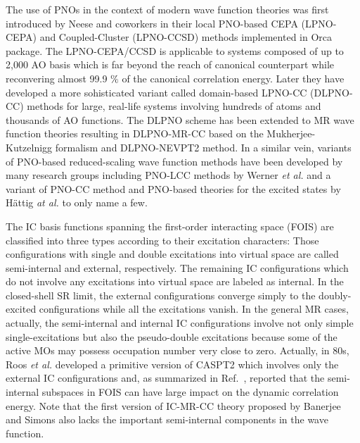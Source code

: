 \documentclass[aip,jcp,amsmath,twocolumn,floatfix,reprint,fleqn]{revtex4-1}
\begin{document}
%
The use of PNOs in the context of modern wave function theories was first introduced by Neese and coworkers in their local PNO-based CEPA (LPNO-CEPA)\cite{neeseefficient2009cepa} and Coupled-Cluster (LPNO-CCSD)\cite{neeseefficient2009,hansenefficient2011,doi:10.1021/ct100445s} methods implemented in Orca package.\cite{WCMS:WCMS1327}
%
The LPNO-CEPA/CCSD is applicable to systems composed of up to 2,000 AO basis which is far beyond the reach of canonical counterpart while reconvering almost 99.9 $\%$ of the canonical correlation energy.
%
Later they have developed a more sohisticated variant called domain-based LPNO-CC (DLPNO-CC) methods for large, real-life systems involving hundreds of atoms and thousands of AO functions.\cite{riplingeran2013,riplingernatural2013,pinskisparse2015,riplingersparse2016,doi:10.1063/1.4981521,dipayan2016}
%
The DLPNO scheme has been extended to MR wave function theories resulting in DLPNO-MR-CC based on the Mukherjee-Kutzelnigg formalism\cite{doi:10.1021/acs.jctc.5b00334,doi:10.1021/acs.jctc.7b01184,C8CP03577F} and DLPNO-NEVPT2\cite{:/content/aip/journal/jcp/144/9/10.1063/1.4942769} method.
%
In a similar vein, variants of PNO-based reduced-scaling wave function methods have been developed by many research groups including PNO-LCC methods by Werner {\it et al.}\cite{doi:10.1021/ct500725e,wernersdecay,doi:10.1021/acs.jctc.7b00554,publ7820099,publ8744633,publ9370681,publ9337428} and a variant of PNO-CC method and PNO-based theories for the excited states by H\"attig {\it at al.}\cite{doi:10.1080/00268976.2013.794314,doi:10.1080/00268976.2016.1263762,doi:10.1063/1.4972001,QUA:QUA24098,C4CP03502J,:/content/aip/journal/jcp/135/7/10.1063/1.3624370,:/content/aip/journal/jcp/135/21/10.1063/1.3664902,:/content/aip/journal/jcp/136/20/10.1063/1.4719981,:/content/aip/journal/jcp/139/8/10.1063/1.4819071} to only name a few.

%
The IC basis functions spanning the first-order interacting space (FOIS) are classified into three types according to their excitation characters:
%
Those configurations with single and double excitations into virtual space are called semi-internal and external, respectively.
%
The remaining IC configurations which do not involve any excitations into virtual space are labeled as internal.
%
In the closed-shell SR limit, the external configurations converge simply to the doubly-excited configurations while all the excitations vanish.
%
In the general MR cases, actually, the semi-internal and internal IC configurations involve not only simple single-excitations but also the pseudo-double excitations because some of the active MOs may possess occupation number very close to zero.
%
Actually, in 80s, Roos {\it et al.} developed a primitive version of CASPT2 which involves only the external IC configurations\cite{ROOS1982197} and, as summarized in Ref.~, reported that the semi-internal subspaces in FOIS can have large impact on the dynamic correlation energy.
%
Note that the first version of IC-MR-CC theory proposed by Banerjee and Simons also lacks the important semi-internal components in the wave function.\cite{simons1981}
\end{document}
